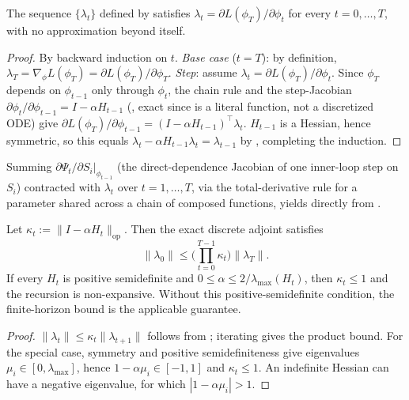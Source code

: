 \begin{proposition}
\label{prop:supp_exact}
The sequence $\{\lambda_t\}$ defined by  satisfies $\lambda_t=\partial L(\phi_T)/\partial\phi_t$ for every $t=0,\dots,T$, with no approximation beyond  itself.
\end{proposition}
\begin{proof}
By backward induction on $t$. \emph{Base case} ($t{=}T$): by definition, $\lambda_T=\nabla_\phi L(\phi_T)=\partial L(\phi_T)/\partial\phi_T$. \emph{Step}: assume $\lambda_t=\partial L(\phi_T)/\partial\phi_t$. Since $\phi_T$ depends on $\phi_{t-1}$ only through $\phi_t$, the chain rule and the step-Jacobian $\partial\phi_t/\partial\phi_{t-1}=I-\alpha H_{t-1}$ (, exact since  is a literal function, not a discretized ODE) give $\partial L(\phi_T)/\partial\phi_{t-1}=(I-\alpha H_{t-1})^\top\lambda_t$. $H_{t-1}$ is a Hessian, hence symmetric, so this equals $\lambda_t-\alpha H_{t-1}\lambda_t=\lambda_{t-1}$ by , completing the induction.
\end{proof}
Summing $\partial\Psi_t/\partial S_i\big|_{\phi_{t-1}}$ (the direct-dependence Jacobian of one inner-loop step on $S_i$) contracted with $\lambda_t$ over $t=1,\dots,T$, via the total-derivative rule for a parameter shared across a chain of composed functions, yields  directly from .

\begin{proposition}
\label{prop:supp_stability}
Let $\kappa_t:=\|I-\alpha H_t\|_{\mathrm{op}}$. Then the exact discrete adjoint satisfies
\begin{equation}
\|\lambda_0\|\le\Big(\prod_{t=0}^{T-1}\kappa_t\Big)\|\lambda_T\|.
\end{equation}
If every $H_t$ is positive semidefinite and $0\le\alpha\le2/\lambda_{\max}(H_t)$, then $\kappa_t\le1$ and the recursion is non-expansive. Without this positive-semidefinite condition, the finite-horizon bound is the applicable guarantee.
\end{proposition}
\begin{proof}
$\|\lambda_t\|\le\kappa_t\|\lambda_{t+1}\|$ follows from ; iterating gives the product bound. For the special case, symmetry and positive semidefiniteness give eigenvalues $\mu_i\in[0,\lambda_{\max}]$, hence $1-\alpha\mu_i\in[-1,1]$ and $\kappa_t\le1$. An indefinite Hessian can have a negative eigenvalue, for which $|1-\alpha\mu_i|>1$.
\end{proof}

